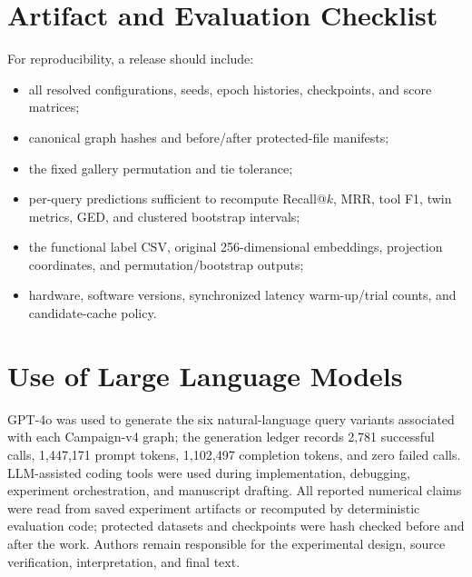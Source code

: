 \documentclass{article}
\begin{document}
\section{Artifact and Evaluation Checklist}

For reproducibility, a release should include:
\begin{itemize}[leftmargin=*]
    \item all resolved configurations, seeds, epoch histories, checkpoints, and score matrices;
    \item canonical graph hashes and before/after protected-file manifests;
    \item the fixed gallery permutation and tie tolerance;
    \item per-query predictions sufficient to recompute Recall@$k$, MRR, tool F1, twin metrics, GED, and clustered bootstrap intervals;
    \item the functional label CSV, original 256-dimensional embeddings, projection coordinates, and permutation/bootstrap outputs;
    \item hardware, software versions, synchronized latency warm-up/trial counts, and candidate-cache policy.
\end{itemize}

\section{Use of Large Language Models}

GPT-4o was used to generate the six natural-language query variants associated with each Campaign-v4 graph; the generation ledger records 2,781 successful calls, 1,447,171 prompt tokens, 1,102,497 completion tokens, and zero failed calls.
LLM-assisted coding tools were used during implementation, debugging, experiment orchestration, and manuscript drafting.
All reported numerical claims were read from saved experiment artifacts or recomputed by deterministic evaluation code; protected datasets and checkpoints were hash checked before and after the work.
Authors remain responsible for the experimental design, source verification, interpretation, and final text.
\end{document}
